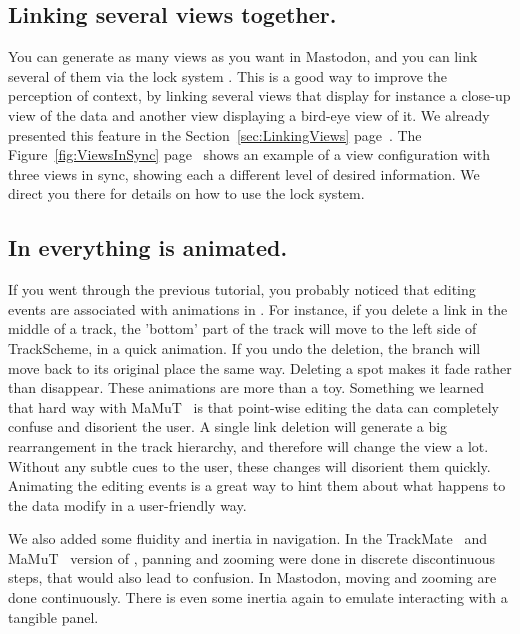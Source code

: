 \subsection{Linking several views together.}

You can generate as many views as you want in Mastodon, and you can link several of them via the lock system .
This is a good way to improve the perception of context, by linking several views that display for instance a close-up view of the data and another view displaying a bird-eye view of it.
We already presented this feature in the Section~\ref{sec:LinkingViews} page~\pageref{sec:LinkingViews}. 
The Figure~\ref{fig:ViewsInSync} page~\pageref{fig:ViewsInSync} shows an example of a view configuration with three views in sync, showing each a different level of desired information.
We direct you there for details on how to use the lock system.


\subsection{In \TrackScheme everything is animated.}

If you went through the previous tutorial, you probably noticed that editing events are associated with animations in \TrackScheme.
For instance, if you delete a link in the middle of a track, the 'bottom' part of the track will move to the left side of TrackScheme, in a quick animation.
If you undo the deletion, the branch will move back to its original place the same way. 
Deleting a spot makes it fade rather than disappear.
These animations are more than a toy.
Something we learned that hard way with MaMuT~\cite{MaMuT} is that point-wise editing the data can completely confuse and disorient the user.
A single link deletion will generate a big rearrangement in the track hierarchy, and therefore will change the \TrackScheme view a lot. 
Without any subtle cues to the user, these changes will disorient them quickly.
Animating the editing events is a great way to hint them about what happens to the data modify in a user-friendly way.

We also added some fluidity and inertia in \TrackScheme navigation. 
In the TrackMate~\cite{TrackMate} and MaMuT~\cite{MaMuT} version of \TrackScheme, panning and zooming were done in discrete discontinuous steps, that would also lead to confusion.
In Mastodon, moving and zooming are done continuously. 
There is even some inertia again to emulate interacting with a tangible panel.



